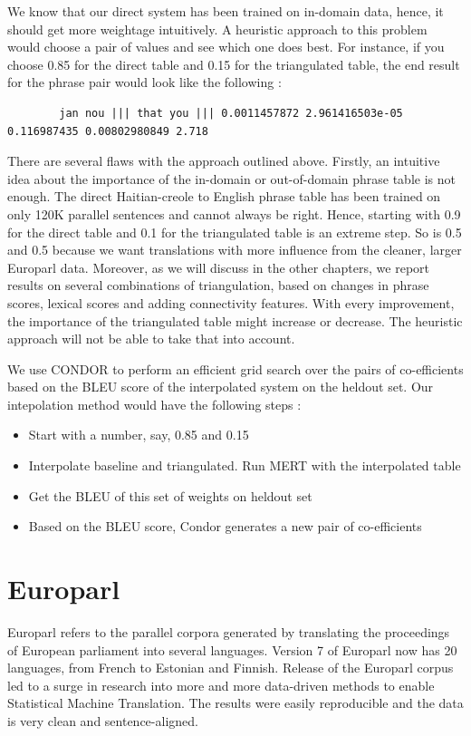 		We know that our direct system has been trained on in-domain data, hence, it should get more weightage intuitively. A heuristic approach to this problem would choose a pair of values and see which one does best. For instance, if you choose 0.85 for the direct table and 0.15 for the triangulated table, the end result for the phrase pair would look like the following : 

	\begin{verbatim}
		jan nou ||| that you ||| 0.0011457872 2.961416503e-05 0.116987435 0.00802980849 2.718	
	\end{verbatim}

		There are several flaws with the approach outlined above. Firstly, an intuitive idea about the importance of the in-domain or out-of-domain phrase table is not enough. The direct Haitian-creole to English phrase table has been trained on only 120K parallel sentences and cannot always be right. Hence, starting with 0.9 for the direct table and 0.1 for the triangulated table is an extreme step. So is 0.5 and 0.5 because we want translations with more influence from the cleaner, larger Europarl data. Moreover, as we will discuss in the other chapters, we report results on several combinations of triangulation, based on changes in phrase scores, lexical scores and adding connectivity features. With every improvement, the importance of the triangulated table might increase or decrease. The heuristic approach will not be able to take that into account. 

		We use CONDOR to perform an efficient grid search over the pairs of co-efficients based on the BLEU score of the interpolated system on the heldout set. Our intepolation method would have the following steps : 
 
		\begin{itemize}
			\item Start with a number, say, 0.85 and 0.15
			\item Interpolate baseline and triangulated. Run MERT with the interpolated table
			\item Get the BLEU of this set of weights on heldout set
			\item Based on the BLEU score, Condor generates a new pair of co-efficients
		\end{itemize}



\section{Europarl}
Europarl refers to the parallel corpora generated by translating the proceedings of European parliament into several languages. Version 7 of Europarl now has 20 languages, from French to Estonian and Finnish. Release of the Europarl corpus led to a surge in research into more and more data-driven methods to enable Statistical Machine Translation. The results were easily reproducible and the data is very clean and sentence-aligned. 

